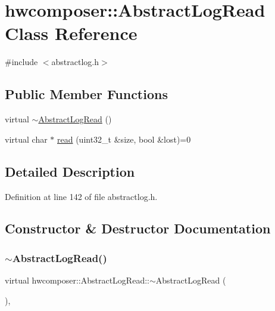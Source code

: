 \hypertarget{classhwcomposer_1_1AbstractLogRead}{}\section{hwcomposer\+:\+:Abstract\+Log\+Read Class Reference}
\label{classhwcomposer_1_1AbstractLogRead}


{\ttfamily \#include $<$abstractlog.\+h$>$}

\subsection*{Public Member Functions}
\begin{DoxyCompactItemize}
\item 
virtual \mbox{\hyperlink{classhwcomposer_1_1AbstractLogRead_a6c6659ac45eb3a233125c6f5de8c28fe}{$\sim$\+Abstract\+Log\+Read}} ()
\item 
virtual char $\ast$ \mbox{\hyperlink{classhwcomposer_1_1AbstractLogRead_af3f88b8c1b9e4ef6f881544d338302ef}{read}} (uint32\+\_\+t \&size, bool \&lost)=0
\end{DoxyCompactItemize}


\subsection{Detailed Description}


Definition at line 142 of file abstractlog.\+h.



\subsection{Constructor \& Destructor Documentation}
\mbox{\label{classhwcomposer_1_1AbstractLogRead_a6c6659ac45eb3a233125c6f5de8c28fe}} 
\subsubsection{\texorpdfstring{$\sim$\+Abstract\+Log\+Read()}{~AbstractLogRead()}}
{\footnotesize\ttfamily virtual hwcomposer\+::\+Abstract\+Log\+Read\+::$\sim$\+Abstract\+Log\+Read (\begin{DoxyParamCaption}{ }\end{DoxyParamCaption})\hspace{0.3cm}{\ttfamily [inline]}, {\ttfamily [virtual]}}



